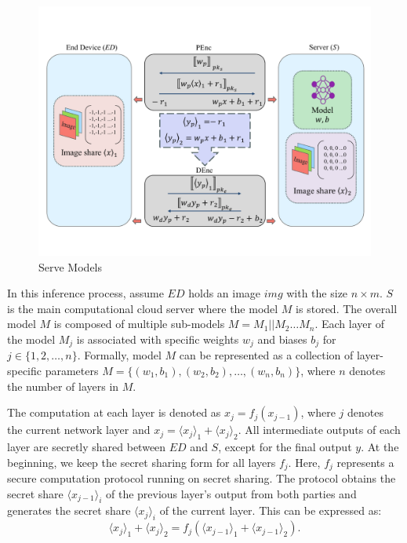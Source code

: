 ﻿\documentclass[conference]{IEEEtran}
\begin{document}
\begin{figure}[ht]
\centering
\includegraphics[scale=0.6]{fig3.pdf}
\caption{Serve Models} \label{fig:Serve_Models}
\end{figure}
In this inference process, assume $ED$ holds an image $img$ with the size $n\times m$. $S$ is the main computational cloud server where the model $M$ is stored. The overall model $M$ is composed of multiple sub-models $M=M_1 || M_2 \dots M_n$. Each layer of the model $M_j$ is associated with specific weights $w_{j}$ and biases $b_{j}$ for $j \in \{1, 2, \dots, n\}$.
Formally, model $M$ can be represented as a collection of layer-specific parameters $M=\{(w_{1},b_{1}),(w_{2},b_{2}),\dots,(w_{n},b_{n})\}$, where $n$ denotes the number of layers in $M$.

The computation at each layer is denoted as $x_j = f_j(x_{j-1})$, where $j$ denotes the current network layer and $x_j=\langle x_j \rangle_1 + \langle x_j \rangle_2$. All intermediate outputs of each layer are secretly shared between $ED$ and $S$, except for the final output $y$. At the beginning, we keep the secret sharing form for all layers $f_j$. Here, $f_j$ represents a secure computation protocol running on secret sharing. The protocol obtains the secret share $\langle x_{j-1} \rangle_i$ of the previous layer's output from both parties and generates the secret share $\langle x_j \rangle_i$ of the current layer. This can be expressed as:
\begin{equation}
    \langle x_j \rangle_1+\langle x_j \rangle_2 = f_j(\langle x_{j-1} \rangle_1 + \langle x_{j-1} \rangle_2).
\end{equation}
\end{document}

